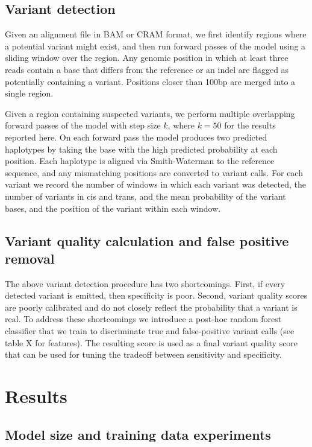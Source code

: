 \documentclass[]{article}
\begin{document}
\subsection{Variant detection}

Given an alignment file in BAM or CRAM format, we first identify regions where a potential variant might exist, and then run forward passes of the model using a sliding window over the region. Any genomic position in which at least three reads contain a base that differs from the reference or an indel are flagged as potentially containing a variant. Positions closer than 100bp are merged into a single region. 

Given a region containing suspected variants, we perform multiple overlapping forward passes of the model with step size $k$, where $k=50$ for the results reported here. On each forward pass the model produces two predicted haplotypes by taking the base with the high predicted probability at each position. Each haplotype is aligned via Smith-Waterman to the reference sequence, and any mismatching positions are converted to variant calls. For each variant we record the number of windows in which each variant was detected, the number of variants in cis and trans, and the mean probability of the variant bases, and the position of the variant within each window.   


\subsection{Variant quality calculation and false positive removal}

The above variant detection procedure has two shortcomings. First, if every detected variant is emitted, then specificity is poor. Second, variant quality scores are poorly calibrated and do not closely reflect the probability that a variant is real. To address these shortcomings we introduce a post-hoc random forest classifier that we train to discriminate true and false-positive variant calls (see table X for features).  The resulting score is used as a final variant quality score that can be used for tuning the tradeoff between sensitivity and specificity. 



\section{Results}

\subsection{Model size and training data experiments}
\end{document}
